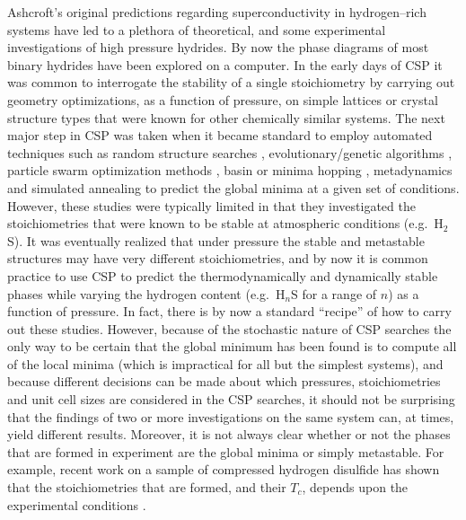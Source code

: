\documentclass[12pt,letterpaper,oneside]{article}
\begin{document}
Ashcroft's original predictions regarding superconductivity in hydrogen--rich systems \cite{Ashcroft:2004a, Ashcroft:2004b} have led to a plethora of theoretical, and some experimental investigations of high pressure hydrides. By now the phase diagrams of most binary hydrides have been explored on a computer. In the early days of CSP it was common to interrogate the stability of a single stoichiometry by carrying out geometry optimizations, as a function of pressure, on simple lattices or crystal structure types that were known for other chemically similar systems. The next major step in CSP was taken when it became standard to employ automated techniques such as random structure searches \cite{random1,random2}, evolutionary/genetic algorithms \cite{Zurek:2011a,gasp,uspex1,maise,Bahmann:2013a,Zunger:2007a,Abraham:2006a,Fadda:2010a,adaptive:2014a}, particle swarm optimization methods \cite{Wang:2010a, Wang:2014a}, basin \cite{Doye:1997a} or minima hopping \cite{Godecker:2004}, metadynamics \cite{Laio:2002a} and simulated annealing \cite{Kirkpatrick:1983} to predict the global minima at a given set of conditions. However, these studies were typically limited in that they investigated the stoichiometries that were known to be stable at atmospheric conditions (e.g.\ H$_2$S). It was eventually realized that under pressure the stable and metastable structures may have very different stoichiometries, and by now it is common practice to use CSP to predict the thermodynamically and dynamically stable phases while varying the hydrogen content (e.g.\ H$_n$S for a range of $n$) as a function of pressure. In fact, there is by now a standard ``recipe'' of how to carry out these studies. However, because of the stochastic nature of CSP searches the only way to be certain that the global minimum has been found is to compute all of the local minima (which is impractical for all but the simplest systems), and because different decisions can be made about which pressures, stoichiometries and unit cell sizes are considered in the CSP searches, it should not be surprising that the findings of two or more investigations on the same system can, at times, yield different results. Moreover, it is not always clear whether or not the phases that are formed in experiment are the global minima or simply metastable. For example, recent work on a sample of compressed hydrogen disulfide has shown that the stoichiometries that are formed, and their $T_c$, depends upon the experimental conditions \cite{Drozdov:2015a}.
\end{document}
